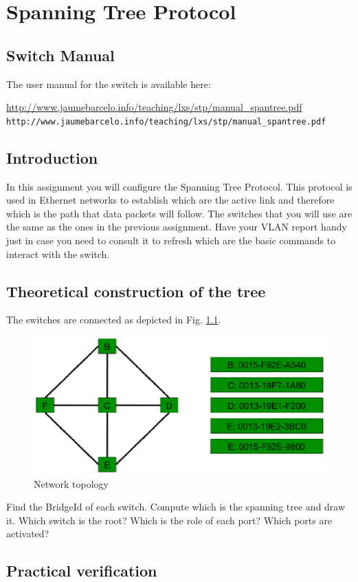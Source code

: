 \chapter{Spanning Tree Protocol}

\section{Switch Manual}
The user manual for the switch is available here:


\ifpdf
\url{http://www.jaumebarcelo.info/teaching/lxs/stp/manual_spantree.pdf}
\else
\texttt{http://www.jaumebarcelo.info/teaching/lxs/stp/manual\_spantree.pdf}
\fi


\section{Introduction}

In this assignment you will configure the Spanning Tree Protocol.
This protocol is used in Ethernet networks to establish which are the active link and therefore which is the path that data packets will follow.
The switches that you will use are the same as the ones in the previous assignment.
Have your VLAN report handy just in case you need to consult it to refresh which are the basic commands to interact with the switch.

\section{Theoretical construction of the tree}
The switches are connected as depicted in Fig. \ref{fig:stp_topology}.
\begin{figure}[htbp]
  \centering
  \includegraphics[width=0.4\linewidth]{figures/stp_topology.eps}
  \caption{Network topology}
  \label{fig:stp_topology}
\end{figure}

Find the BridgeId of each switch.
Compute which is the spanning tree and draw it.
Which switch is the root?
Which is the role of each port?
Which ports are activated?

\section{Practical verification}

